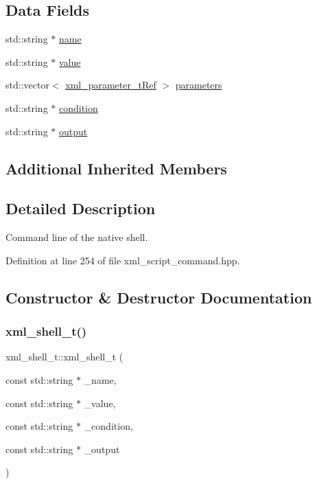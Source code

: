 \subsection*{Data Fields}
\begin{DoxyCompactItemize}
\item 
std\+::string $\ast$ \hyperlink{classxml__shell__t_a299caa74dd192213aae967a07a83e34f}{name}
\item 
std\+::string $\ast$ \hyperlink{classxml__shell__t_ad37f4489480205e4410812601449916f}{value}
\item 
std\+::vector$<$ \hyperlink{xml__script__command_8hpp_aec6b63d2a298703bc3ead113609b27a6}{xml\+\_\+parameter\+\_\+t\+Ref} $>$ \hyperlink{classxml__shell__t_ae8d69a24e9be3b4c62b029995479695c}{parameters}
\item 
std\+::string $\ast$ \hyperlink{classxml__shell__t_a60466261290dff23df2f5ea3f6a988c7}{condition}
\item 
std\+::string $\ast$ \hyperlink{classxml__shell__t_a60b9e3f90a51340e2b16e8f2ea089edc}{output}
\end{DoxyCompactItemize}
\subsection*{Additional Inherited Members}


\subsection{Detailed Description}
Command line of the native shell. 

Definition at line 254 of file xml\+\_\+script\+\_\+command.\+hpp.



\subsection{Constructor \& Destructor Documentation}
\mbox{\label{classxml__shell__t_ac761bcf9dc05b760bc95839f856491d7}} 
\subsubsection{\texorpdfstring{xml\+\_\+shell\+\_\+t()}{xml\_shell\_t()}\hspace{0.1cm}{\footnotesize\ttfamily [1/2]}}
{\footnotesize\ttfamily xml\+\_\+shell\+\_\+t\+::xml\+\_\+shell\+\_\+t (\begin{DoxyParamCaption}\item[{const std\+::string $\ast$}]{\+\_\+name,  }\item[{const std\+::string $\ast$}]{\+\_\+value,  }\item[{const std\+::string $\ast$}]{\+\_\+condition,  }\item[{const std\+::string $\ast$}]{\+\_\+output }\end{DoxyParamCaption})}




